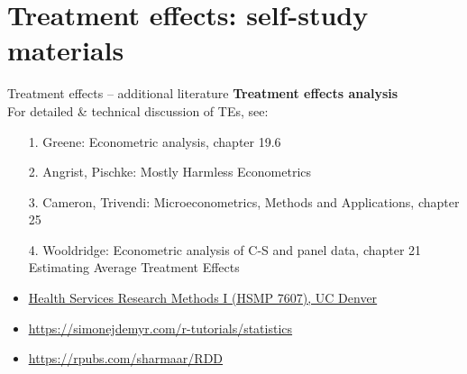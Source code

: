 \documentclass{beamer}
\begin{document}
\section{Treatment effects: self-study materials}
\begin{frame}{Treatment effects -- additional literature}
\textbf{Treatment effects analysis}\\
\medskip
For detailed \& technical discussion of TEs, see:\\
\medskip
\begin{itemize}
\item[1.] Greene: Econometric analysis, chapter 19.6
\item[2.] Angrist, Pischke: Mostly Harmless Econometrics
\item[3.] Cameron, Trivendi: Microeconometrics, Methods and Applications, chapter 25
\item[4.] Wooldridge: Econometric analysis of C-S and panel data, chapter 21 Estimating Average Treatment Effects
\bigskip
\item \textcolor{blue}{\underline{\href{https://clas.ucdenver.edu/marcelo-perraillon/teaching/health-services-research-methods-i-hsmp-7607}{Health Services Research Methods I (HSMP 7607), UC Denver}}}
\item \textcolor{blue}{\underline{\href{https://simonejdemyr.com/r-tutorials/statistics/tutorial8.html}{https://simonejdemyr.com/r-tutorials/statistics}}}
\item \textcolor{blue}{\underline{\href{https://rpubs.com/sharmaar/RDD}{https://rpubs.com/sharmaar/RDD}}}
\end{itemize}
\end{frame}
\end{document}
